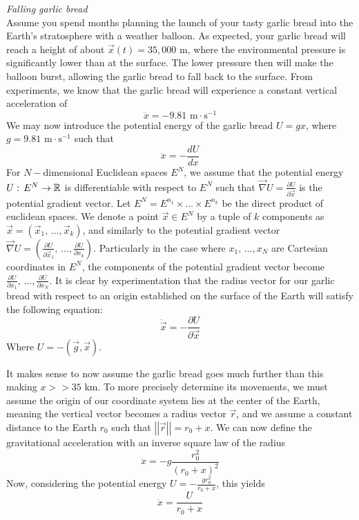 \documentclass{article}
\begin{document}
		\begin{exmp}
			\textit{Falling garlic bread} \\
			Assume you spend months planning the launch of your tasty garlic bread into the Earth's stratosphere with a weather balloon. As expected, your garlic bread will reach a height of about $\vec{x}(t)=35,000$ m, where the environmental pressure is significantly lower than at the surface. The lower pressure then will make the balloon burst, allowing the garlic bread to fall back to the surface. From experiments, we know that the garlic bread will experience a constant vertical acceleration of
			$$ \ddot{x} = -9.81 \text{ m}\cdot\text{s}^{-1}$$
			We may now introduce the potential energy of the garlic bread $U=gx$, where $g = 9.81 \text{ m}\cdot\text{s}^{-1}$ such that
			$$ \ddot{x} = - \frac{dU}{dx}$$
			For $N-$dimensional Euclidean spaces $E^N$, we assume that the potential energy $U:\, E^N \to \mathbb{R}$ is differentiable with respect to $E^N$ such that $\vec{\nabla} U = \frac{\partial U}{\partial \vec{x}}$ is the potential gradient vector. Let $E^N = E^{n_1} \times \dots \times E^{n_k}$ be the direct product of euclidean spaces. We denote a point $\vec{x} \in E^N$ by a tuple of $k$ components as $\vec{x} = \left( \vec{x}_1, \, \dots, \vec{x}_k \right)$, and similarly to the potential gradient vector $\vec{\nabla} U = \left( \frac{\partial U}{\partial \vec{x}_1}, \, \dots, \frac{\partial U}{\partial x_k}\right)$. Particularly in the case where $x_1, \, \dots, x_N$ are Cartesian coordinates in $E^N$, the components of the potential gradient vector become $\frac{\partial U}{\partial x_1}, \, \dots, \frac{\partial U}{\partial x_N}$. 
			It is clear by experimentation that the radius vector for our garlic bread with respect to an origin established on the surface of the Earth will satisfy the following equation:
			$$ \ddot{\vec{x}} = - \frac{\partial U}{\partial \vec{x}}$$
			Where $U = -\left(\vec{g}, \vec{x}\right)$. 
			
			It makes sense to now assume the garlic bread goes much further than this making $x >> 35$ km. To more precisely determine its movements, we must assume the origin of our coordinate system lies at the center of the Earth, meaning the vertical vector becomes a radius vector $\vec{r}$, and we assume a constant distance to the Earth $r_0$ such that $\left|\left| \vec{r} \right|\right| = r_0 + x$. We can now define the gravitational acceleration with an inverse square law of the radius
			$$ \ddot{x} = -g \frac{r_0^2}{\left(r_0 + x\right)^2}$$
			Now, considering the potential energy $U = -\frac{g r_0^2}{r_0 + x}$, this yields
			$$ \ddot{x} = \frac{U}{r_0 + x}$$ 
		\end{exmp}
\end{document}
